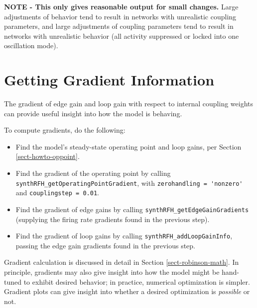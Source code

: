 \textbf{NOTE - This only gives reasonable output for small changes.} Large
adjustments of behavior tend to result in networks with unrealistic coupling
parameters, and large adjustments of coupling parameters tend to result in
networks with unrealistic behavior (all activity suppressed or locked into
one oscillation mode).

%
%
\section{Getting Gradient Information}
\label{sect-howto-gradient}

The gradient of edge gain and loop gain with respect to internal coupling
weights can provide useful insight into how the model is behaving.

To compute gradients, do the following:

\begin{sloppypar}
\begin{itemize}
%
\item Find the model's steady-state operating point and loop gains, per
Section \ref{sect-howto-oppoint}.
%
\item Find the gradient of the operating point by calling
\verb|synthRFH_getOperatingPointGradient|,
 with \verb|zerohandling = 'nonzero'| and
\verb|couplingstep = 0.01|.
%
\item Find the gradient of edge gains by calling
\verb|synthRFH_getEdgeGainGradients| (supplying the firing rate gradients
found in the previous step).
%
\item Find the gradient of loop gains by calling
\verb|synthRFH_addLoopGainInfo|, passing the edge gain gradients found
in the previous step.
%
\end{itemize}
\end{sloppypar}

Gradient calculation is discussed in detail in Section
\ref{sect-robinson-math}. In principle, gradients may also give insight into
how the model might be hand-tuned to exhibit desired behavior; in practice,
numerical optimization is simpler. Gradient plots can give insight into
whether a desired optimization is \textit{possible} or not.

%

